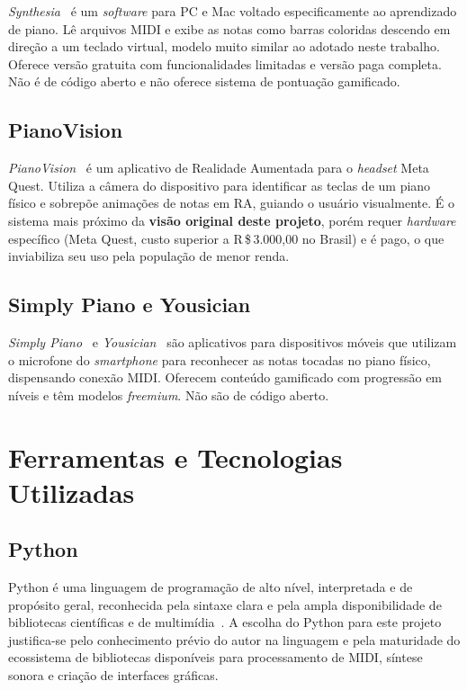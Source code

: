 \documentclass[
  12pt,
  openright,
  twoside,
  a4paper,
  english,
  brazil
]{abntex2}
\begin{document}
\textit{Synthesia}~\cite{synthesia} é um \textit{software} para PC e Mac
voltado especificamente ao aprendizado de piano. Lê arquivos MIDI e exibe
as notas como barras coloridas descendo em direção a um teclado virtual,
modelo muito similar ao adotado neste trabalho. Oferece versão gratuita
com funcionalidades limitadas e versão paga completa. Não é de código
aberto e não oferece sistema de pontuação gamificado.

\subsection{PianoVision\textregistered}

\textit{PianoVision\textregistered}~\cite{pianovision} é um aplicativo de
Realidade Aumentada para o \textit{headset} Meta Quest. Utiliza a câmera
do dispositivo para identificar as teclas de um piano físico e sobrepõe
animações de notas em RA, guiando o usuário visualmente. É o sistema
mais próximo da \textbf{visão original deste projeto}, porém requer
\textit{hardware} específico (Meta Quest, custo superior a
R\,\$\,3.000,00 no Brasil) e é pago, o que inviabiliza seu uso pela
população de menor renda.

\subsection{Simply Piano e Yousician}

\textit{Simply Piano}~\cite{simplypiano} e
\textit{Yousician}~\cite{yousician} são aplicativos para dispositivos
móveis que utilizam o microfone do \textit{smartphone} para reconhecer
as notas tocadas no piano físico, dispensando conexão MIDI. Oferecem
conteúdo gamificado com progressão em níveis e têm modelos
\textit{freemium}. Não são de código aberto.

\section{Ferramentas e Tecnologias Utilizadas}

\subsection{Python}

Python é uma linguagem de programação de alto nível, interpretada e de
propósito geral, reconhecida pela sintaxe clara e pela ampla
disponibilidade de bibliotecas científicas e de
multimídia~\cite{vanrossum2009}. A escolha do Python para este projeto
justifica-se pelo conhecimento prévio do autor na linguagem e pela
maturidade do ecossistema de bibliotecas disponíveis para processamento
de MIDI, síntese sonora e criação de interfaces gráficas.
\end{document}
